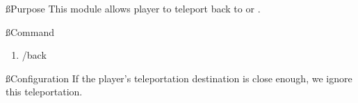 \ss{Purpose}
This module allows player to teleport back to  or .

\ss{Command}
\begin{enumerate}
    \item /back
\end{enumerate}

\ss{Configuration}
If the player's teleportation destination is close enough, we ignore this teleportation.



